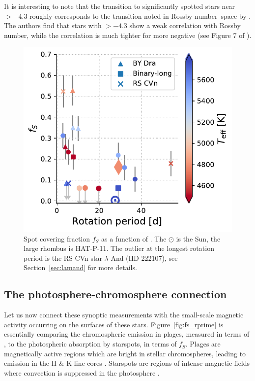 It is interesting to note that the transition to significantly spotted stars near \logrprime$> -4.3$ roughly corresponds to the transition noted in Rossby number--\logrprime space by \citet{Mamajek2008}. The authors find that stars with \logrprime$> -4.3$ show a weak correlation with Rossby number, while the correlation is much tighter for more negative \logrprime (see Figure 7 of \citealt{Mamajek2008}).

\begin{figure}
    \centering
    \includegraphics[scale=0.8]{freckles/rotation.pdf}
    \caption{Spot covering fraction $f_S$ as a function of \logrprime. The $\odot$ is the Sun, the large rhombus is HAT-P-11. The outlier at the longest rotation period is the RS CVn star $\lambda$ And (HD 222107), see Section~\ref{sec:lamand} for more details.}
    \label{fig:fs_rotation}
\end{figure}



\subsection{The photosphere-chromosphere connection}

Let us now connect these synoptic measurements with the small-scale magnetic activity occurring on the surfaces of these stars. Figure~\ref{fig:fs_rprime} is essentially comparing the chromospheric emission in plages, measured in terms of \logrprime, to the photospheric absorption by starspots, in terms of $f_S$. Plages are magnetically active regions which are bright in stellar chromospheres, leading to emission in the  H \& K line cores \citep{Hall2008}.  Starspots are regions of intense magnetic fields where convection is suppressed in the photosphere \citep{Solanki2003}. 

